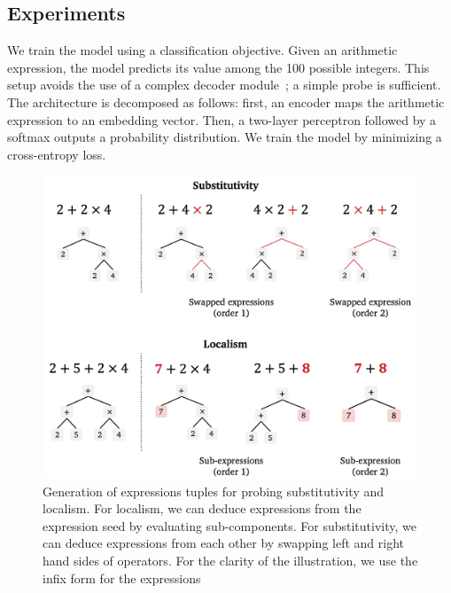 \subsection{Experiments}


We train the model using a classification objective. Given an arithmetic expression, the model predicts its value among the 100 possible integers. This setup avoids the use of a complex decoder module~;  a simple probe is sufficient. The architecture is decomposed as follows: first, an encoder maps the arithmetic expression to an embedding vector. Then, a two-layer perceptron followed by a softmax outputs a probability distribution. We train the model by minimizing a cross-entropy loss.

\begin{figure}[htb!]
    \centering
    \includegraphics[width=\textwidth]{images/loc_prod_5.png}
    \caption{Generation of expressions tuples for probing substitutivity and localism. For localism, we can deduce expressions from the expression seed by evaluating sub-components. For substitutivity, we can deduce expressions from each other by swapping left and right hand sides of operators. For the clarity of the illustration, we use the infix form for the expressions}
\end{figure}

